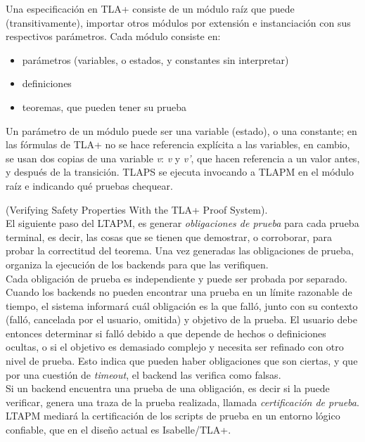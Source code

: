 \documentclass[spanish]{llncs}
\begin{document}
  Una especificación en TLA+ consiste de un módulo raíz que puede (transitivamente), importar otros módulos por extensión e instanciación con
  sus respectivos parámetros. Cada módulo consiste en:

  \begin{itemize}
   \item parámetros (variables, o estados, y constantes sin interpretar)
   \item definiciones
   \item teoremas, que pueden tener su prueba
  \end{itemize}

  Un parámetro de un módulo puede ser una variable (estado), o una constante; en las fórmulas de TLA+ no se hace referencia explícita a las variables, en cambio, se usan dos copias de una variable \textit{v}: \textit{v} y \textit{v'}, que hacen referencia a un valor antes, y después de la transición. 
  TLAPS se ejecuta invocando a TLAPM en el módulo raíz e indicando qué pruebas chequear. 

  (Verifying Safety Properties With the TLA+ Proof System).
  \\
  
  El siguiente paso del LTAPM, es generar \textit{obligaciones de prueba} para cada prueba terminal, es decir, las cosas que se tienen que demostrar, o corroborar, para probar la correctitud del teorema. Una vez generadas las obligaciones de prueba, organiza la ejecución de los backends para que las verifiquen.
  \\
  
  Cada obligación de prueba es independiente y puede ser probada por separado. Cuando los backends no pueden encontrar una prueba en un límite razonable de tiempo, el sistema informará cuál obligación es la que falló, junto con su contexto (falló, cancelada por el usuario, omitida) y objetivo de la prueba.
  El usuario debe entonces determinar si falló debido a que depende de hechos o definiciones ocultas, o si el objetivo es demasiado complejo y necesita ser refinado con otro nivel de prueba. Esto indica que pueden haber obligaciones que son ciertas, y que por una cuestión de \textit{timeout},
  el backend las verifica como falsas.
  \\
  
  Si un backend encuentra una prueba de una obligación, es decir si la puede verificar, genera una traza de la prueba realizada, llamada \textit{certificación de prueba}. LTAPM  mediará la certificación de los scripts de prueba en un entorno lógico confiable, que en el diseño actual es Isabelle/TLA+.
  \\
  
\end{document}
